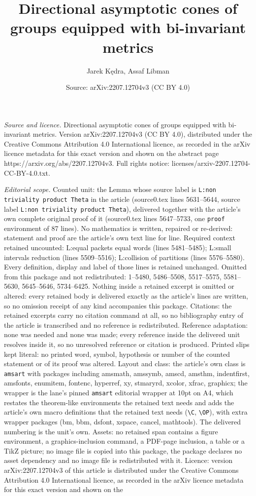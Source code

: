 \documentclass[10pt,a4paper]{amsart}
\title[Directional asymptotic cones of groups equipped with bi-inva]{Directional asymptotic cones of groups equipped with bi-invariant metrics}
\author{Jarek K\k{e}dra, Assaf Libman}
\date{Source: arXiv:2207.12704v3 (CC BY 4.0)}
\begin{document}
\maketitle

\noindent\emph{Source and licence.} Directional asymptotic cones of groups equipped with bi-invariant metrics. Version arXiv:2207.12704v3 (CC BY 4.0), distributed under the Creative Commons Attribution 4.0 International licence, as recorded in the arXiv licence metadata for this exact version and shown on the abstract page https://arxiv.org/abs/2207.12704v3. Full rights notice: licenses/arxiv-2207.12704-CC-BY-4.0.txt.\par\smallskip

\noindent\textit{Editorial scope.} Counted unit: the Lemma whose source label is \texttt{L:non triviality product Theta} in the article (source0.tex lines 5631--5644, source label \texttt{L:non triviality product Theta}), delivered together with the article's own complete original proof of it (source0.tex lines 5647--5733, one \texttt{proof} environment of 87 lines). No mathematics is written, repaired or re-derived: statement and proof are the article's own text line for line. Required context retained uncounted: L:equal packets equal words (lines 5481--5485); L:small intervals reduction (lines 5509--5516); L:collision of partitions (lines 5576--5580). Every definition, display and label of those lines is retained unchanged. Omitted from this package and not redistributed: 1--5480, 5486--5508, 5517--5575, 5581--5630, 5645--5646, 5734--6425. Nothing inside a retained excerpt is omitted or altered: every retained body is delivered exactly as the article's lines are written, so no omission receipt of any kind accompanies this package. Citations: the retained excerpts carry no citation command at all, so no bibliography entry of the article is transcribed and no reference is redistributed. Reference adaptation: none was needed and none was made; every reference inside the delivered unit resolves inside it, so no unresolved reference or citation is produced. Printed slips kept literal: no printed word, symbol, hypothesis or number of the counted statement or of its proof was altered. Layout and class: the article's own class is \texttt{amsart} with packages including amsmath, amssymb, amscd, amsthm, indentfirst, amsfonts, enumitem, fontenc, hyperref, xy, stmaryrd, xcolor, xfrac, graphicx; the wrapper is the lane's pinned \texttt{amsart} editorial wrapper at 10pt on A4, which restates the theorem-like environments the retained text needs and adds the article's own macro definitions that the retained text needs (\texttt{\textbackslash C}, \texttt{\textbackslash OP}), with extra wrapper packages (bm, bbm, dsfont, xspace, cancel, mathtools). The delivered numbering is the unit's own. Assets: no retained span contains a figure environment, a graphics-inclusion command, a PDF-page inclusion, a table or a TikZ picture; no image file is copied into this package, the package declares no asset dependency and no image file is redistributed with it. Licence: version arXiv:2207.12704v3 of this article is distributed under the Creative Commons Attribution 4.0 International licence, as recorded in the arXiv licence metadata for this exact version and shown on the 
\end{document}
